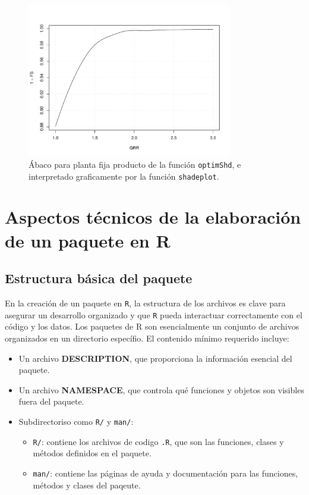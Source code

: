 \begin{figure}[!htb]
\centering
\includegraphics[width=0.8\textwidth]{figuras/codigo-optimshdfixed.pdf}
\caption{Ábaco para planta fija producto de la función \texttt{optimShd}, e interpretado graficamente por la función \texttt{shadeplot}.}
\end{figure}


\section{Aspectos técnicos de la elaboración de un paquete en R}
\label{sec:orgd05d53a}
\label{sec:aspectos-tecnicos}
\subsection{Estructura básica del paquete}
\label{sec:org320bacb}
\label{subsec:estructura-paquete}
En la creación de un paquete en \texttt{R}, la estructura de los archivos es clave para asegurar un desarrollo organizado y que \texttt{R} pueda interactuar correctamente con el código y  los datos. Los paquetes de R son esencialmente un conjunto de archivos organizados en un directorio específio. El contenido mínimo requerido incluye:
\begin{itemize}
\item Un archivo \textbf{DESCRIPTION}, que proporciona la información esencial del paquete.
\item Un archivo \textbf{NAMESPACE}, que controla qué funciones y objetos son visibles fuera del paquete.
\item Subdirectoriso como \texttt{R/} y \texttt{man/}:
\begin{itemize}
\item \texttt{R/}: contiene los archivos de codigo \texttt{.R}, que son las funciones, clases y métodos definidos en el paquete.
\item \texttt{man/}: contiene las páginas de ayuda y documentación para las funciones, métodos y clases del paqeute.
\end{itemize}
\end{itemize}


